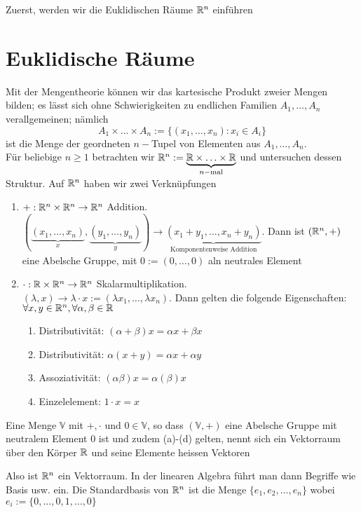 \noindent Zuerst, werden wir die Euklidischen Räume $\mathbb{R}^n$ einführen
\section{Euklidische Räume}
Mit der Mengentheorie können wir das kartesische Produkt zweier Mengen bilden; es lässt sich ohne Schwierigkeiten zu endlichen Familien $A_1,\dots ,A_n$ verallgemeinen; nämlich \[A_1\times\dots\times A_n:=\{\left(x_1,\dots ,x_n\right):x_i\in A_i \}\] ist die Menge der geordneten $n-$Tupel von Elementen aus $A_1,\dots ,A_n$.\\

Für beliebige $n\geq 1$ betrachten wir $ \mathbb{R}^n: = \underbrace {\mathbb{R} \times  \ldots  \times \mathbb{R} }_{n - {\text{mal}}}$ und untersuchen dessen Struktur. Auf $\mathbb{R}^n$ haben wir zwei Verknüpfungen
\begin{enumerate}
\item $+:\mathbb{R}^n\times\mathbb{R}^n\to\mathbb{R}^n$ Addition.\\
$\left( {\underbrace {\left( {{x_1}, \ldots ,{x_n}} \right)}_x,\underbrace {\left( {{y_1}, \ldots ,{y_n}} \right)}_y} \right) \to \underbrace {\left( {{x_1} + {y_1}, \ldots ,{x_n} + {y_n}} \right)}_{{\text{Komponentenweise Addition}}}$. Dann ist $\left( \mathbb{R}^n,+\right)$ eine Abelsche Gruppe, mit $0:=(0,\dots,0)$ aln neutrales Element
\item $\cdot:\mathbb{R}\times\mathbb{R}^n\to\mathbb{R}^n$ Skalarmultiplikation.\\
$(\lambda,x)\to\lambda\cdot x:=(\lambda x_1,\dots,\lambda x_n)$. Dann gelten die folgende Eigenschaften: $\forall x,y\in\mathbb{R}^n,\forall \alpha,\beta\in\mathbb{R}$

\begin{enumerate}
\item Distributivität: $\left( \alpha+\beta\right) x=\alpha x+\beta x$
\item Distributivität: $\alpha\left(x+y\right) = \alpha x+\alpha y$
\item Assoziativität: $\left( \alpha\beta\right) x=\alpha\left( \beta\right) x$
\item Einzelelement: $1\cdot x=x$
\end{enumerate}
\end{enumerate}

\begin{definition}{2.15}
Eine Menge $\mathbb{V}$ mit $+,\cdot$ und $0\in\mathbb{V}$, so dass $\left(\mathbb{V},+\right)$ eine Abelsche Gruppe mit neutralem Element 0 ist und zudem (a)-(d) gelten, nennt sich ein Vektorraum über den Körper $\mathbb{R}$ und seine Elemente heissen Vektoren
\end{definition}
Also ist $\mathbb{R}^n$ ein Vektorraum. In der linearen Algebra führt man dann Begriffe wie Basis usw. ein. Die Standardbasis von $\mathbb{R}^n$ ist die Menge $\{e_1,e_2,\dots,e_n \}$ wobei $e_i:=\{0,\dots,0,1,\dots,0\}$ \\

